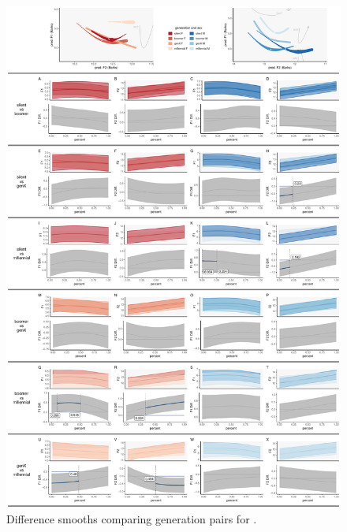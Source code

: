 \begin{figure}[p]
    \centering
    \includegraphics[width=\textwidth]{Figures/BANG/BANG_detailed_generation_panel_plot.pdf}
    \caption{Difference smooths comparing generation pairs for \bang.}
    \label{fig:bang_diff_smooths_gen}
\end{figure}

